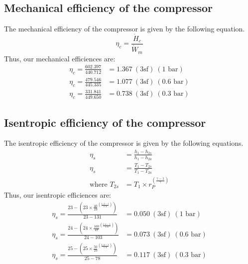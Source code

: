 \documentclass[class=article, crop=false, 12pt,a4paper]{standalone}
\numberwithin{equation}{section}
\begin{document}
\subsection{Mechanical efficiency of the compressor}
The mechanical efficiency of the compressor is given by the following equation.
\begin{equation}
  \eta_c = \frac{\dot{H}_c}{\dot{W}_m}
\end{equation}
Thus, our mechanical efficiences are:
\begin{align}
  \eta_c = \frac{602.397}{440.712} &= 1.367 \ (3\textrm{sf}) \ (1 \textrm{ bar})\\
  \eta_c = \frac{479.546}{445.335} &= 1.077 \ (3\textrm{sf}) \ (0.6 \textrm{ bar})\\
  \eta_c = \frac{331.841}{449.650} &= 0.738 \ (3\textrm{sf}) \ (0.3 \textrm{ bar})
\end{align}
\subsection{Isentropic efficiency of the compressor}
The isentropic efficiency of the compressor is given by the following equations.
\begin{align}
  \eta_s &= \frac{h_1 - h_{2s}}{h_1 - h_{2a}}\\
  \eta_s &= \frac{T_1 - T_{2s}}{T_1 - T_{2a}}\\
  \textrm{where } T_{2s} &= T_1 \times r_P^{\left(\frac{\gamma -1}{\gamma} \right)}
\end{align}
Thus, our isentropic efficiences are:
\begin{align}
  \eta_s = \frac{23 - \left( 23 \times \frac{40}{19}^{\left(\frac{1.4 -1}{1.4} \right)} \right)}{23 - 131} &= 0.050 \ (3\textrm{sf}) \ (1 \textrm{ bar})\\
  \eta_s = \frac{24 - \left( 24 \times \frac{100}{47}^{\left(\frac{1.4 -1}{1.4} \right)} \right)}{24 - 103} &= 0.073 \ (3\textrm{sf}) \ (0.6 \textrm{ bar})\\
  \eta_s = \frac{25 - \left( 25 \times \frac{50}{23}^{\left(\frac{1.4 -1}{1.4} \right)} \right)}{25 - 78} &= 0.117 \ (3\textrm{sf}) \ (0.3 \textrm{ bar})
\end{align}
\end{document}
